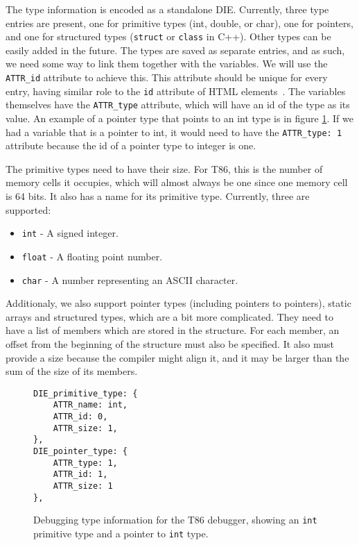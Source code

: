 The type information is encoded as a standalone DIE. Currently, three type
entries are present, one for primitive types (int, double, or char), one for
pointers, and one for structured types (\texttt{struct} or \texttt{class} in
C++). Other types can be easily added in the future. The types are saved as
separate entries, and as such, we need some way to link them together with the
variables. We will use the \verb|ATTR_id| attribute to achieve this. This
attribute should be unique for every entry, having similar role to the
\texttt{id} attribute of HTML elements~\cite{html4}. The variables themselves
have the \verb|ATTR_type| attribute, which will have an id of the type as its
value. An example of a pointer type that points to an int type is in figure
\ref{fig:t86dbg-types}. If we had a variable that is a pointer to int, it would
need to have the \verb|ATTR_type: 1| attribute because the id of a pointer type
to integer is one.

The primitive types need to have their size. For T86, this is the number of
memory cells it occupies, which will almost always be one since one memory cell
is 64 bits. It also has a name for its primitive type. Currently, three
are supported:
\begin{itemize}
    \item \texttt{int} - A signed integer.
    \item \texttt{float} - A floating point number.
    \item \texttt{char} - A number representing an ASCII character.
\end{itemize}

Additionaly, we also support pointer types (including pointers to pointers),
static arrays and structured types, which are a bit more complicated. They need
to have a list of members which are stored in the structure. For each member,
an offset from the beginning of the structure must also be specified. It also
must provide a size because the compiler might align it, and it may be larger
than the sum of the size of its members.

\begin{figure}
    \begin{lstlisting}
DIE_primitive_type: {
    ATTR_name: int,
    ATTR_id: 0,
    ATTR_size: 1,
},
DIE_pointer_type: {
    ATTR_type: 1,
    ATTR_id: 1,
    ATTR_size: 1
},
    \end{lstlisting}
    \caption{Debugging type information for the T86 debugger, showing an
    \texttt{int} primitive type and a pointer to \texttt{int} type.}
    \label{fig:t86dbg-types}
\end{figure}

